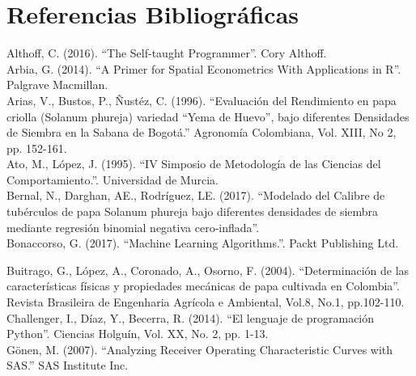 
\chapter*{Referencias Bibliográficas}

\noindent
Althoff, C. (2016). "`The Self-taught Programmer"'. Cory Althoff.\\

\noindent
Arbia, G. (2014). "`A Primer for Spatial Econometrics With Applications in R"'. Palgrave Macmillan.\\

\noindent
Arias, V., Bustos, P., Ñustéz, C. (1996). "`Evaluación del Rendimiento en papa criolla (Solanum phureja) variedad "`Yema de Huevo"', bajo diferentes Densidades de Siembra en la Sabana de Bogotá."' Agronomía Colombiana, Vol. XIII, No 2, pp. 152-161.\\

\noindent
Ato, M., López, J. (1995). "`IV Simposio de Metodología de las Ciencias del Comportamiento."'. Universidad de Murcia.\\

\noindent
Bernal, N., Darghan, AE., Rodríguez, LE. (2017). "`Modelado del Calibre de tubérculos de papa Solanum phureja bajo diferentes densidades de siembra mediante regresión binomial negativa cero-inflada"'.\\

\noindent
Bonaccorso, G. (2017).  "`Machine Learning Algorithms."'. Packt Publishing Ltd.

\noindent
Buitrago, G., López, A., Coronado, A., Osorno, F. (2004). "`Determinación de las características físicas y propiedades mecánicas de papa cultivada en Colombia"'. Revista Brasileira de Engenharia Agrícola e Ambiental, Vol.8, No.1, pp.102-110.\\

\noindent
Challenger, I., Díaz, Y., Becerra, R. (2014). "`El lenguaje de programación Python"'. Ciencias Holguín, Vol. XX, No. 2, pp. 1-13.\\

\noindent
Gönen, M. (2007). "`Analyzing Receiver Operating Characteristic Curves with SAS."' SAS Institute Inc.\\

